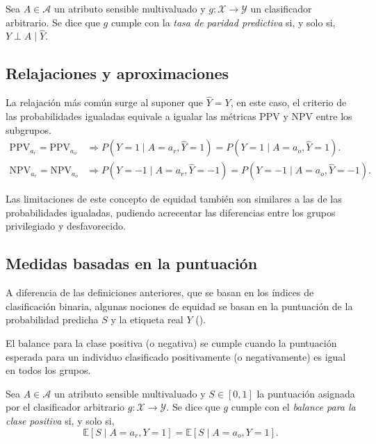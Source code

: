 \documentclass[oneside,openright,titlepage,numbers=noenddot,openany,headinclude,footinclude=true,
cleardoublepage=empty,abstractoff,BCOR=5mm,paper=a4,fontsize=12pt,main=spanish]{scrreprt}
\begin{document}
\begin{definition}
Sea $A \in \mathcal{A}$ un atributo sensible multivaluado y $g\colon \mathcal{X} \to \mathcal{Y}$ un clasificador arbitrario. Se dice que $g$ cumple con la \textit{tasa de paridad predictiva} si, y solo si, $Y \perp A \mid \hat{Y}$.
\end{definition}

\subsection*{Relajaciones y aproximaciones}

La relajación más común surge al suponer que $\hat{Y}=Y$, en este caso, el criterio de las probabilidades igualadas equivale a igualar las métricas PPV y NPV entre los subgrupos. 
\begin{equation*}
\begin{split}
\text{PPV}_{a_r}=\text{PPV}_{a_o} &\Rightarrow P(Y=1 \mid A=a_r, \hat{Y}=1)=P(Y=1 \mid A=a_o, \hat{Y}=1).\\
\text{NPV}_{a_r}=\text{NPV}_{a_o} &\Rightarrow P(Y=-1 \mid A=a_r,\hat{Y}=-1)=P(Y=-1 \mid A=a_o,\hat{Y}=-1).
\end{split}
\end{equation*}

Las limitaciones de este concepto de equidad también son similares a las de las probabilidades igualadas, pudiendo acrecentar las diferencias entre los grupos privilegiado y desfavorecido.

\subsection{Medidas basadas en la puntuación}

A diferencia de las definiciones anteriores, que se basan en los índices de clasificación binaria, algunas nociones de equidad se basan en la puntuación de la probabilidad predicha $S$ y la etiqueta real $Y$ (\cite{catalogue2018}).

El balance para la clase positiva (o negativa) se cumple cuando la puntuación esperada para un individuo clasificado positivamente (o negativamente) es igual en todos los grupos.\\

\begin{definition}
Sea $A \in \mathcal{A}$ un atributo sensible multivaluado y $S\in [0,1]$ la puntuación asignada por el clasificador arbitrario $g\colon \mathcal{X} \to \mathcal{Y}$. Se dice que $g$ cumple con el \textit{balance para la clase positiva} si, y solo si, $$\mathbb{E}[S \mid A=a_r,Y=1]=\mathbb{E}[S \mid A=a_o,Y=1].$$
\end{definition}\
\end{document}
